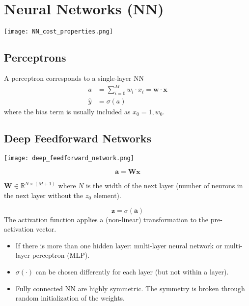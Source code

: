 \section{Neural Networks (NN)}
\begin{center}
    \texttt{[image: NN\_cost\_properties.png]}
\end{center}

\subsection{Perceptrons}
A perceptron corresponds to a single-layer NN
\begin{align*}
    a           & =\sum_{i=0}^M w_i\cdot x_i= \mathbf{w}\cdot \mathbf{x} \\
    \widehat{y} & =\sigma(a)
\end{align*}
where the bias term is usually included as $x_0=1,w_0$.
\subsection{Deep Feedforward Networks}

\begin{center}
    \texttt{[image: deep\_feedforward\_network.png]}
\end{center}


\begin{equation*}
    \mathbf{a} = \mathbf{W} \mathbf{x}
\end{equation*}

$\mathbf{W} \in \mathbb{R}^{N\times (M+1)}$ where $N$ is the width of the next layer (number of neurons in the next layer without the $z_0$ element).

\newpar{}
\begin{equation*}
    \mathbf{z} = \sigma(\mathbf{a})
\end{equation*}
The activation function applies a (non-linear) transformation to the pre-activation vector.

\newpar{}
\begin{itemize}
    \item If there is more than one hidden layer: multi-layer neural network or multi-layer perceptron (MLP).
    \item $\sigma(\cdot)$ can be chosen differently for each layer (but not within a layer).
    \item Fully connected NN are highly symmetric. The symmetry is broken through random initialization of the weights.
\end{itemize}


